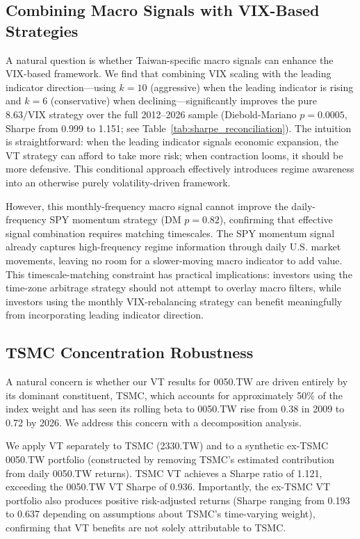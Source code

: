 \subsection{Combining Macro Signals with VIX-Based Strategies}

A natural question is whether Taiwan-specific macro signals can enhance the VIX-based framework. We find that combining VIX scaling with the leading indicator direction---using $k = 10$ (aggressive) when the leading indicator is rising and $k = 6$ (conservative) when declining---significantly improves the pure $8.63/\text{VIX}$ strategy over the full 2012--2026 sample (Diebold-Mariano $p = 0.0005$, Sharpe from 0.999 to 1.151; see Table~\ref{tab:sharpe_reconciliation}). The intuition is straightforward: when the leading indicator signals economic expansion, the VT strategy can afford to take more risk; when contraction looms, it should be more defensive. This conditional approach effectively introduces regime awareness into an otherwise purely volatility-driven framework.

However, this monthly-frequency macro signal cannot improve the daily-frequency SPY momentum strategy (DM $p = 0.82$), confirming that effective signal combination requires matching timescales. The SPY momentum signal already captures high-frequency regime information through daily U.S. market movements, leaving no room for a slower-moving macro indicator to add value. This timescale-matching constraint has practical implications: investors using the time-zone arbitrage strategy should not attempt to overlay macro filters, while investors using the monthly VIX-rebalancing strategy can benefit meaningfully from incorporating leading indicator direction.


\subsection{TSMC Concentration Robustness}
\label{sec:tsmc}

A natural concern is whether our VT results for 0050.TW are driven entirely by its dominant constituent, TSMC, which accounts for approximately 50\% of the index weight and has seen its rolling beta to 0050.TW rise from 0.38 in 2009 to 0.72 by 2026. We address this concern with a decomposition analysis.

We apply VT separately to TSMC (2330.TW) and to a synthetic ex-TSMC 0050.TW portfolio (constructed by removing TSMC's estimated contribution from daily 0050.TW returns). TSMC VT achieves a Sharpe ratio of 1.121, exceeding the 0050.TW VT Sharpe of 0.936. Importantly, the ex-TSMC VT portfolio also produces positive risk-adjusted returns (Sharpe ranging from 0.193 to 0.637 depending on assumptions about TSMC's time-varying weight), confirming that VT benefits are not solely attributable to TSMC.

